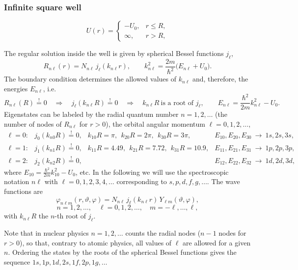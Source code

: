 \documentclass[11pt,a4paper]{article}
\begin{document}
\subsubsection*{Infinite square well}
\[
U(r)=\begin{cases}-U_0, & r\le R,\\ \infty, & r>R,\end{cases}
\]
\begin{center}
\end{center}
The regular solution inside the well is given by spherical Bessel functions $j_\ell$,
\[
R_{n\ell}(r)=N_{n\ell}\,j_\ell(k_{n\ell}r),
\qquad
k_{n\ell}^2=\frac{2m}{\hbar^2}\big(E_{n\ell}+U_0\big).
\]
The boundary condition determines the allowed values of $k_{n\ell}$ and, therefore, the energies $E_{n\ell}$, i.e. 
\[
R_{n\ell}(R)\overset{!}{=}0\quad\Longrightarrow\quad j_\ell(k_{n\ell}R)\overset{!}{=}0
\quad\Longrightarrow\quad k_{n\ell}R\ \text{is a root of } j_\ell ,
\qquad
E_{n\ell}=\frac{\hbar^2}{2m}k_{n\ell}^2-U_0 .
\]
Eigenstates can be labeled by the radial quantum number $n=1,2,\dots$ (the number of nodes of $R_{n\ell}$ for $r>0$), the orbital angular momentum $\ell=0,1,2,\dots$, 
\[
\begin{array}{llll}
\ell=0: & j_0(k_{n0}R)\overset{!}{=}0, & k_{10}R=\pi,\ \ k_{20}R=2\pi,\ \ k_{30}R=3\pi, & E_{10},E_{20},E_{30}\ \to\ 1s,2s,3s,\\[1mm]
\ell=1: & j_1(k_{n1}R)\overset{!}{=}0, & k_{11}R=4.49,\ \ k_{21}R=7.72,\ \ k_{31}R=10.9, & E_{11},E_{21},E_{31}\ \to\ 1p,2p,3p,\\[1mm]
\ell=2: & j_2(k_{n2}R)\overset{!}{=}0, & & E_{12},E_{22},E_{32}\ \to\ 1d,2d,3d,
\end{array}
\]
where $E_{10}=\frac{\hbar^2}{2m}k_{10}^2-U_0$, etc. In the following we will use the spectroscopic notation $n\ell$ with $\ell=0,1,2,3,4,\dots$ corresponding to $s,p,d,f,g,\dots$.
The wave functions are
\[
\varphi_{n\ell m}(r,\vartheta,\varphi)=N_{n\ell}\,j_\ell(k_{n\ell}r)\,Y_{\ell m}(\vartheta,\varphi),
\]
\[
n=1,2,\dots,\quad \ell=0,1,2,\dots,\quad m=-\ell,\dots,\ell,
\]
with $k_{n\ell}R$ the $n$-th root of $j_\ell$.

Note that in nuclear physics $n=1,2,\dots$ counts the radial nodes ($n-1$ nodes for $r>0$), so that, contrary to atomic physics, all values of $\ell$ are allowed for a given $n$. Ordering the states by the roots of the spherical Bessel functions gives the sequence $1s,1p,1d,2s,1f,2p,1g,\dots$ 
\end{document}

